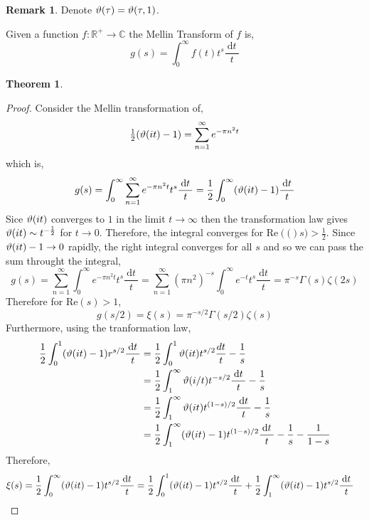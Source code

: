 \documentclass{article}
\newcommand{\R}{\mathbb{R}}
\newcommand{\C}{\mathbb{C}}
\renewcommand{\d}[1]{\: \mathrm{d}#1 \:}
\theoremstyle{definition}
\newtheorem{theorem}{Theorem}[section]
\newtheorem{remark}{Remark}[section]
\newenvironment{definition}[1][Definition:]{\begin{trivlist}
\item[\hskip \labelsep {\bfseries #1}]}{\end{trivlist}}
\begin{document}
\begin{remark}
Denote $\vartheta(\tau) = \vartheta(\tau, 1)$.
\end{remark}

\newcommand{\Rplus}{\R^+}
\renewcommand{\Re}[1]{\mathrm{Re}\left( #1 \right)}

\begin{definition}
Given a function $f : \Rplus \to \C$ the Mellin Transform of $f$ is,
\[ g(s) = \int_{0}^\infty f(t) t^s \frac{\d{t}}{t} \]
\end{definition}


\begin{theorem}

\end{theorem}

\begin{proof}
Consider the Mellin transformation of,
\[ \tfrac{1}{2} (\vartheta(it) - 1) = \sum_{n = 1}^\infty e^{-\pi n^2 t} \]
which is,
\[ g(s) = \int_0^\infty \sum_{n =1}^\infty e^{-\pi n^2 t} t^s \frac{\d{t}}{t}  = \frac{1}{2} \int_0^\infty (\vt(it) - 1) \frac{\d{t}}{t} \]
Sice $\vartheta(it)$ converges to $1$ in the limit $t \to \infty$ then the transformation law gives $\vartheta(it) \sim t^{-\frac{1}{2}}$ for $t \to 0$. Therefore, the integral converges for $\Re(s) > \frac{1}{2}$. Since $\vartheta(it) - 1 \to 0$ rapidly, the right integral converges for all $s$ and so we can pass the sum throught the integral,
\[ g(s) = \sum_{n = 1}^\infty \int_0^\infty e^{- \pi n^2 t} t^s \frac{\d{t}}{t} = \sum_{n = 1}^\infty (\pi n^2)^{-s} \int _0^\infty e^{-t} t^s \frac{\d{t}}{t} = \pi^{-s} \Gamma(s) \zeta(2 s) \]
Therefore for $\Re{s} > 1$,
\[ g(s/2) = \xi(s) = \pi^{-s/2} \Gamma(s/2) \zeta(s) \]
Furthermore, using the tranformation law,
\begin{align*}
\frac{1}{2} \int_0^1 (\vt(it) - 1) r^{s/2} \frac{\d{t}}{t} & = \frac{1}{2} \int_0^1 \vt(it) t^{s/2} \frac{d{t}}{t} - \frac{1}{s}
\\
& = \frac{1}{2} \int_1^\infty \vt(i / t) t^{-s / 2} \frac{\d{t}}{t} - \frac{1}{s}
\\
& = \frac{1}{2} \int_1^\infty \vt(i t) t^{(1 - s)/2} \frac{\d{t}}{t} - \frac{1}{s}
\\
& = \frac{1}{2} \int_1^\infty (\vt(i t) - 1) t^{(1 - s)/2} \frac{\d{t}}{t} - \frac{1}{s} - \frac{1}{1 - s}
\end{align*}
Therefore, 
\begin{align*}
\xi(s) & = \frac{1}{2} \int_0^\infty (\vt(it) - 1) t^{s/2} \frac{\d{t}}{t} = \frac{1}{2} \int_0^1 (\vt(it) - 1) t^{s/2} \frac{\d{t}}{t} + \frac{1}{2} \int_1^\infty (\vt(it) - 1) t^{s/2} \frac{\d{t}}{t}

\end{align*}
\end{proof}
\end{document}
